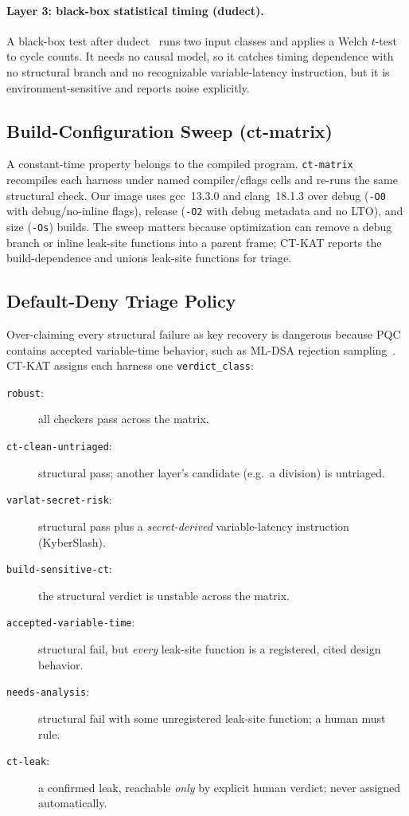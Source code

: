 \paragraph{Layer 3: black-box statistical timing (dudect).}
A black-box test after dudect~\cite{dudect} runs two input classes and applies a
Welch $t$-test to cycle counts. It needs no causal model, so it catches timing
dependence with no structural branch and no recognizable variable-latency
instruction, but it is environment-sensitive and reports noise explicitly.

\subsection{Build-Configuration Sweep (ct-matrix)}
\label{ssec:matrix}

A constant-time property belongs to the compiled program. \texttt{ct-matrix}
recompiles each harness under named compiler/cflags cells and re-runs the same
structural check. Our image uses gcc~13.3.0 and clang~18.1.3 over debug
(\texttt{-O0} with debug/no-inline flags), release (\texttt{-O2} with debug
metadata and no LTO), and size (\texttt{-Os}) builds. The sweep matters because
optimization can remove a debug branch or inline leak-site functions into a
parent frame; CT-KAT reports the build-dependence and unions leak-site functions
for triage.

\subsection{Default-Deny Triage Policy}
\label{ssec:triage}

Over-claiming every structural failure as key recovery is dangerous because PQC
contains accepted variable-time behavior, such as ML-DSA rejection
sampling~\cite{fips204,dilithium}. CT-KAT assigns each harness one
\texttt{verdict\_class}:
\begin{description}
  \item[\texttt{robust}:] all checkers pass across the matrix.
  \item[\texttt{ct-clean-untriaged}:] structural pass; another layer's candidate
        (e.g.\ a division) is untriaged.
  \item[\texttt{varlat-secret-risk}:] structural pass plus a
        \emph{secret-derived} variable-latency instruction (KyberSlash).
  \item[\texttt{build-sensitive-ct}:] the structural verdict is unstable across
        the matrix.
  \item[\texttt{accepted-variable-time}:] structural fail, but \emph{every}
        leak-site function is a registered, cited design behavior.
  \item[\texttt{needs-analysis}:] structural fail with some unregistered
        leak-site function; a human must rule.
  \item[\texttt{ct-leak}:] a confirmed leak, reachable \emph{only} by explicit
        human verdict; never assigned automatically.
\end{description}

